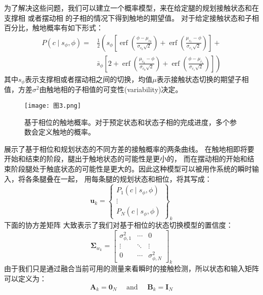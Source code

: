 为了解决这些问题，我们可以建立一个概率模型，来在给定腿的规划接触状态和在支撑相 或者摆动相 的子相的情况下得到触地的期望值。
对于给定接触状态和子相百分比，触地概率有如下形式：
\begin{equation}
    \label{equ:est_contact_prob}
    \begin{aligned}
        P\left(c \mid s_\phi, \phi\right)= & \frac{1}{2}\left(s_\phi\left[\operatorname{erf}\left(\frac{\phi-\mu_{c_0}}{\sigma_{c_0} \sqrt{2}}\right)+\operatorname{erf}\left(\frac{\mu_{c_1}-\phi}{\sigma_{c_1} \sqrt{2}}\right)\right]+\right. \\
        & \left.\bar{s}_\phi\left[2+\operatorname{erf}\left(\frac{\mu_{\bar{c}_0}-\phi}{\sigma_{\bar{c}_0} \sqrt{2}}\right)+\operatorname{erf}\left(\frac{\phi-\mu_{\bar{c}_1}}{\sigma_{\bar{c}_1} \sqrt{2}}\right)\right]\right)
        \end{aligned}
\end{equation}
其中$s_{\phi}$表示支撑相或者摆动相之间的切换，均值$\mu$表示接触状态切换的期望子相值，方差$\sigma^2$由触地相的子相值的可变性(variability)决定。
\begin{figure}[htbp]
    \centering
    \texttt{[image: 图3.png]}
    \caption{\label{fig:gauss_phase}基于相位的触地概率。对于预定状态和状态子相的完成进度，多个参数会定义触地的概率。}
\end{figure}
展示了基于相位和规划状态的不同方差的接触概率的两条曲线。
在触地相即将要开始和结束的阶段，腿出于触地状态的可能性是更小的，
而在摆动相的开始和结束阶段腿处于触底状态的可能性是更大的。因此这种模型可以被用作系统的瞬时输入，将各条腿叠在一起，
用每条腿的规划状态和相位，将其写成：
\begin{equation}
    \label{equ:est_input}
    \boldsymbol{u}_k=\left\{\begin{array}{c}
        P_1\left(c \mid s_\phi, \phi\right) \\
        \vdots \\
        P_N\left(c \mid s_\phi, \phi\right)
        \end{array}\right\}_k
\end{equation}
下面的协方差矩阵 大致表示了我们对基于相位的状态切换模型的置信度：
\begin{equation}
    \label{equ:est_process_noise}
    \boldsymbol{\Sigma}_{w_k}=\left[\begin{array}{ccc}
        \sigma_{\phi, 1}^2 & \cdots & 0 \\
        \vdots & \ddots & \vdots \\
        0 & \cdots & \sigma_{\phi, N}^2
        \end{array}\right]_k
\end{equation}
由于我们只是通过融合当前可用的测量来看瞬时的接触检测，所以状态和输入矩阵可以定义为：
\begin{equation}
    \label{equ:est_process_matrix}
    \boldsymbol{A}_k=\mathbf{0}_N \quad \text { and } \quad \boldsymbol{B}_k=\mathbf{I}_N
\end{equation}


